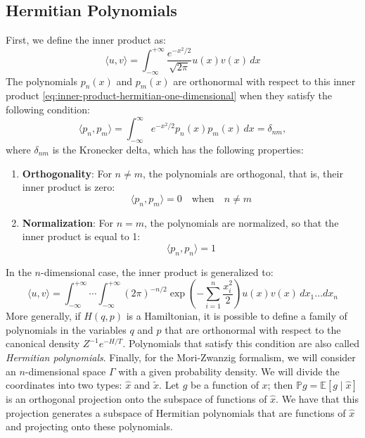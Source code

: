 \documentclass[12pt]{article}
\begin{document}
\subsection{Hermitian Polynomials}
First, we define the inner product as:
\begin{equation}
    \langle u, v \rangle = \int_{-\infty}^{+\infty} \frac{e^{-x^2/2}}{\sqrt{2 \pi}} u(x) v(x) \, dx
    \label{eq:inner-product-hermitian-one-dimensional}
\end{equation}
The polynomials $p_n(x)$ and $p_m(x)$ are orthonormal with respect to this inner product \eqref{eq:inner-product-hermitian-one-dimensional} when they satisfy the following condition:
\begin{equation*}
    
\langle p_n, p_m \rangle = \int_{-\infty}^{\infty} e^{-x^2/2} p_n(x) p_m(x) \, dx = \delta_{nm},
\end{equation*}
where $\delta_{nm}$ is the Kronecker delta, which has the following properties:
\begin{enumerate}
    
\item \textbf{Orthogonality}: For $n \neq m$, the polynomials are orthogonal, that is, their inner product is zero:
          \begin{equation*}
\langle p_n, p_m \rangle = 0 \quad \text{when} \quad n \neq m
\end{equation*}
                          
\item \textbf{Normalization}: For $n = m$, the polynomials are normalized, so that the inner product is equal to 1:
          \begin{equation*}
            
\langle p_n, p_n \rangle = 1
          \end{equation*}
\end{enumerate}
In the $n$-dimensional case, the inner product is generalized to:
\begin{equation*}
\langle u, v \rangle = \int_{-\infty}^{+\infty} \cdots \int_{-\infty}^
{+\infty} (2 \pi)^{-n/2} \exp \left(-\sum_{i=1}^n \frac{x_i^2}{2} \right) u(x) v(x) \, dx_1 \ldots dx_n
\end{equation*}
More generally, if $H(q, p)$ is a Hamiltonian, it is possible to define a family of polynomials in the variables $q$ and $p$ that are orthonormal with respect to the canonical density $Z^{-1} e^{-H/T}$. Polynomials that satisfy this condition are also called \textit{Hermitian polynomials}.
Finally, for the Mori-Zwanzig formalism, we will consider an $n$-dimensional space $\Gamma$ with a given probability density. We will divide the coordinates into two types: $\hat{x}$ and $\tilde{x}$. Let $g$ be a function of $x$; then $\mathbb{P}g = \mathbb{E}[g \mid \hat{x}]$ is an orthogonal projection onto the subspace of functions of $\hat{x}$. We have that this projection generates a subspace of Hermitian polynomials that are functions of $\hat{x}$ and projecting onto these polynomials.
\newpage
\end{document}
